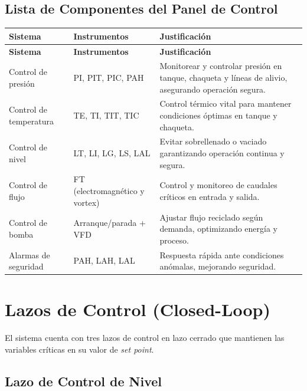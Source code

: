 \documentclass[12pt,letterpaper]{article}
\begin{document}
\subsection{Lista de Componentes del Panel de Control}

\renewcommand{\arraystretch}{1.3}
\begin{longtable}{L{3.2cm} L{4.5cm} L{6.8cm}}
\toprule
{}
\color{white}\textbf{Sistema} & \color{white}\textbf{Instrumentos} & \color{white}\textbf{Justificación} \\
\midrule
\endfirsthead
\toprule
{}
\color{white}\textbf{Sistema} & \color{white}\textbf{Instrumentos} & \color{white}\textbf{Justificación} \\
\midrule
\endhead
\bottomrule
\endfoot
Control de presión       & PI, PIT, PIC, PAH       & Monitorear y controlar presión en tanque, chaqueta y líneas de alivio, asegurando operación segura. \\
Control de temperatura   & TE, TI, TIT, TIC         & Control térmico vital para mantener condiciones óptimas en tanque y chaqueta. \\
Control de nivel         & LT, LI, LG, LS, LAL     & Evitar sobrellenado o vaciado garantizando operación continua y segura. \\
Control de flujo         & FT (electromagnético y vortex) & Control y monitoreo de caudales críticos en entrada y salida. \\
Control de bomba         & Arranque/parada + VFD   & Ajustar flujo reciclado según demanda, optimizando energía y proceso. \\
Alarmas de seguridad     & PAH, LAH, LAL           & Respuesta rápida ante condiciones anómalas, mejorando seguridad. \\
\bottomrule
\end{longtable}

\section{Lazos de Control (Closed-Loop)}

El sistema cuenta con tres lazos de control en lazo cerrado que mantienen las variables críticas en su valor de \textit{set point}.

\subsection{Lazo de Control de Nivel}
\end{document}
